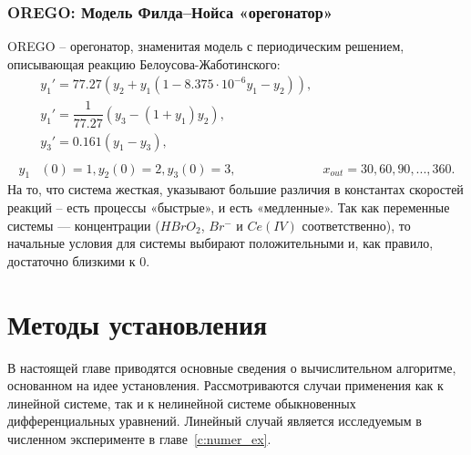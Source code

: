 \documentclass[a4paper,14pt]{extreport}
\begin{document}
\subsection{OREGO: Модель Филда–Нойса «орегонатор»}
  \label{ss:orego}
OREGO -- орегонатор, знаменитая модель с периодическим решением, описывающая реакцию Белоусова-Жаботинского:
\begin{equation}
	\begin{aligned}
	\label{orego}
	&y_1' = 77.27(y_2+y_1(1-8.375\cdot10^{-6}y_1-y_2)),\\
	&y_1' = \dfrac{1}{77.27}(y_3-(1+y_1)y_2),\\
	&y_3' = 0.161(y_1-y_3),\\
	\\
	y_1&(0)=1, y_2(0) = 2, y_3(0) = 3, & x_{out}=30, 60, 90, ..., 360.
	\end{aligned}
	\end{equation}
	На то, что система жесткая, указывают большие различия в константах скоростей реакций -- есть процессы «быстрые», и есть «медленные».
Так как переменные системы — концентрации ($HBrO_2$, $Br^{-}$ и $Ce(IV)$ соответственно), то начальные условия для системы  выбирают положительными и, как правило, достаточно близкими к $0$.
  
  
  

  \chapter{Методы установления}
  \label{c:stead_methods}
  В настоящей главе приводятся основные сведения о вычислительном алгоритме, основанном на идее установления. Рассмотриваются случаи применения как к линейной системе, так и к нелинейной системе обыкновенных дифференциальных уравнений. Линейный случай является исследуемым в численном эксперименте в главе~\ref{c:numer_ex}.
  
\end{document}
